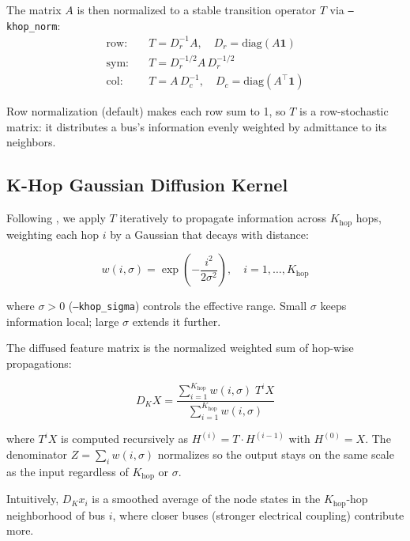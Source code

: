 \documentclass{article}
\begin{document}
The matrix $A$ is then normalized to a stable transition operator $T$
via \texttt{--khop\_norm}:
\begin{align}
  \text{row:} \quad & T = D_r^{-1} A, \quad D_r = \mathrm{diag}(A\mathbf{1})
  \label{eq:row}\\
  \text{sym:} \quad & T = D_r^{-1/2} A\, D_r^{-1/2}
  \label{eq:sym}\\
  \text{col:} \quad & T = A\, D_c^{-1}, \quad D_c = \mathrm{diag}(A^\top\mathbf{1})
  \label{eq:col}
\end{align}

Row normalization (default) makes each row sum to 1, so $T$ is a
row-stochastic matrix: it distributes a bus's information evenly weighted
by admittance to its neighbors.

\subsection{K-Hop Gaussian Diffusion Kernel}

Following \cite{zhang2026khg}, we apply $T$ iteratively to propagate
information across $K_{\mathrm{hop}}$ hops, weighting each hop $i$ by a
Gaussian that decays with distance:

\begin{equation}
  w(i, \sigma) = \exp\!\left(-\frac{i^2}{2\sigma^2}\right), \quad
  i = 1, \ldots, K_{\mathrm{hop}}
\end{equation}

where $\sigma > 0$ (\texttt{--khop\_sigma}) controls the effective range.
Small $\sigma$ keeps information local; large $\sigma$ extends it further.

The diffused feature matrix is the normalized weighted sum of hop-wise
propagations:

\begin{equation}
  D_K X
  =
  \frac{\displaystyle\sum_{i=1}^{K_{\mathrm{hop}}} w(i,\sigma)\; T^i X}
       {\displaystyle\sum_{i=1}^{K_{\mathrm{hop}}} w(i,\sigma)}
  \label{eq:dkx}
\end{equation}

where $T^i X$ is computed recursively as $H^{(i)} = T \cdot H^{(i-1)}$
with $H^{(0)} = X$.  The denominator $Z = \sum_i w(i,\sigma)$ normalizes
so the output stays on the same scale as the input regardless of
$K_{\mathrm{hop}}$ or $\sigma$.

Intuitively, $D_K x_i$ is a smoothed average of the node states in
the $K_{\mathrm{hop}}$-hop neighborhood of bus $i$, where closer buses
(stronger electrical coupling) contribute more.
\end{document}
